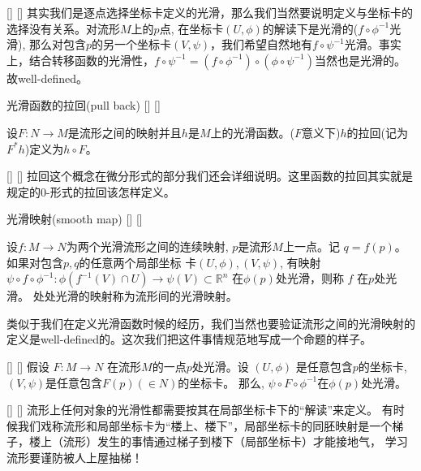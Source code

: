 \documentclass[UTF8]{ctexart}
\begin{document}
    \begin{rmk}
        []
        {}
        []
        []
        其实我们是逐点选择坐标卡定义的光滑，那么我们当然要说明定义与坐标卡的选择没有关系。对流形$M$上的$p$点, 在坐标卡$(U,\phi)$的解读下是光滑的($f \circ \phi^{−1}$光滑), 那么对包含$p$的另一个坐标卡$(V,\psi)$，我们希望自然地有$f \circ \psi^{−1}$光滑。事实上，结合转移函数的光滑性，$f \circ \psi^{−1} = (f \circ \phi^{−1}) \circ (\phi \circ \psi^{−1})$当然也是光滑的。故well-defined。
    \end{rmk}

    \begin{dfn}
        []
        {光滑函数的拉回(pull back)}
        []
        []

        设$F:N \rightarrow M$是流形之间的映射并且$h$是$M$上的光滑函数。($F$意义下)$h$的拉回(记为$F^{*}h$)定义为$h \circ F$。
    \end{dfn}

    \begin{rmk}
        []
        {}
        []
        []
        拉回这个概念在微分形式的部分我们还会详细说明。这里函数的拉回其实就是规定的0-形式的拉回该怎样定义。
    \end{rmk}

    \vspace{10pt}
    
    \begin{dfn}
        []
        {光滑映射(smooth map)}
        []
        []

        设$f :M \rightarrow N $为两个光滑流形之间的连续映射,
        $p$是流形$M$上一点。记 $q = f(p)$。
        如果对包含$p,q$的任意两个局部坐标
        卡$(U,\phi),(V,\psi)$,
        有映射$ \psi \circ f \circ \phi^{−1} : \phi(f^{-1}(V) \cap U) \rightarrow \psi(V) \subset \mathbb{R}^n $ 在$\phi(p)$处光滑，则称 $f$ 在$p$处光滑。
        处处光滑的映射称为流形间的光滑映射。
    \end{dfn}

    类似于我们在定义光滑函数时候的经历，我们当然也要验证流形之间的光滑映射的定义是well-defined的。这次我们把这件事情规范地写成一个命题的样子。

    \begin{ppt}
        []
        {}
        []
        []
        假设 $F : M \rightarrow N $ 在流形$M$的一点$p$处光滑。设 $(U, \phi)$ 是任意包含$p$的坐标卡, $(V , \psi)$是任意包含$F(p)(\in N)$的坐标卡。 那么, $ \psi \circ F \circ \phi^{−1} $在$\phi(p)$处光滑。
    \end{ppt}
    
    \begin{rmk}
        []
        {}
        []
        []
        流形上任何对象的光滑性都需要按其在局部坐标卡下的“解读”来定义。
        有时候我们戏称流形和局部坐标卡为“楼上、楼下”，局部坐标卡的同胚映射是一个梯子，楼上（流形）发生的事情通过梯子到楼下（局部坐标卡）才能接地气，
        学习流形要谨防被人上屋抽梯！
    \end{rmk}
\end{document}
